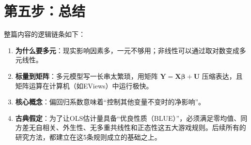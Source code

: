 \documentclass[12pt,a4paper]{ctexart}
\newcommand{\vect}[1]{\mathbf{#1}}
\newcommand{\mat}[1]{\mathbf{#1}}
\begin{document}
\section*{第五步：总结}

整篇内容的逻辑链条如下：
\begin{enumerate}
\item \textbf{为什么要多元}：现实影响因素多，一元不够用；非线性可以通过取对数变成多元线性。
\item \textbf{标量到矩阵}：多元模型写一长串太繁琐，用矩阵 \(\vect{Y} = \mat{X}\boldsymbol{\beta} + \vect{U}\) 压缩表达，且矩阵运算在计算机（如EViews）中运行极快。
\item \textbf{核心概念}：偏回归系数意味着“控制其他变量不变时的净影响”。
\item \textbf{古典假定}：为了让OLS估计量具备“优良性质（BLUE）”，必须满足零均值、同方差无自相关、外生性、无多重共线性和正态性这五大游戏规则。后续所有的研究方法，都建立在这5条规则成立的基础之上。
\end{enumerate}
\end{document}
